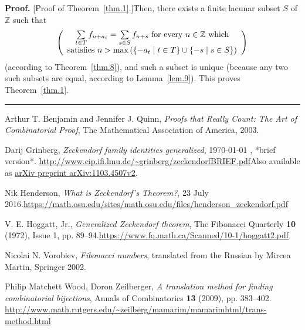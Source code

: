 \documentclass[numbers=enddot,12pt,final,onecolumn,notitlepage]{scrartcl}%
\numberwithin{exer}{section}
\theoremstyle{definition}
\newenvironment{proof}[1][Proof]{\noindent\textbf{#1.} }{\ \rule{0.5em}{0.5em}}
\let\sumnonlimits\sum
\renewcommand{\sum}{\sumnonlimits\limits}
\begin{document}
\begin{proof}
[Proof of Theorem~\ref{thm.1}.]Then, there exists a finite lacunar subset $S$
of $\mathbb{Z}$ such that
\[
\left(
\begin{array}
[c]{c}%
\sum\limits_{t\in T}f_{n+a_{t}}=\sum\limits_{s\in S}f_{n+s}\text{ for every
}n\in\mathbb{Z}\text{ which}\\
\text{satisfies }n>\max\left(  \left\{  -a_{t}\mid t\in T\right\}
\cup\left\{  -s\mid s\in S\right\}  \right)
\end{array}
\right)
\]
(according to Theorem~\ref{thm.8}), and such a subset is unique (because any
two such subsets are equal, according to Lemma~\ref{lem.9}). This proves
Theorem~\ref{thm.1}.
\end{proof}

\begin{thebibliography}{99999999}                                                                                         %


Arthur T. Benjamin and Jennifer J. Quinn,
\textit{Proofs that Really Count: The Art of Combinatorial Proof}, The
Mathematical Association of America, 2003.

Darij Grinberg, \textit{Zeckendorf family
identities generalized},
\today
, *brief version*.\newline%
\url{http://www.cip.ifi.lmu.de/~grinberg/zeckendorfBRIEF.pdf}\newline Also
available as \href{https://arxiv.org/abs/1103.4507v2}{arXiv preprint
arXiv:1103.4507v2}.

Nik Henderson, \textit{What is Zeckendorf's
Theorem?}, 23 July 2016.\newline\url{https://math.osu.edu/sites/math.osu.edu/files/henderson_zeckendorf.pdf}

V. E. Hoggatt, Jr., \textit{Generalized Zeckendorf
theorem}, The Fibonacci Quarterly \textbf{10} (1972), Issue 1, pp.
89--94.\newline\url{https://www.fq.math.ca/Scanned/10-1/hoggatt2.pdf}

Nicolai N. Vorobiev, \textit{Fibonacci numbers},
translated from the Russian by Mircea Martin, Springer 2002.

Philip Matchett Wood, Doron Zeilberger, \textit{A
translation method for finding combinatorial bijections}, Annals of
Combinatorics \textbf{13} (2009), pp. 383--402. \newline\url{http://www.math.rutgers.edu/~zeilberg/mamarim/mamarimhtml/trans-method.html}
\end{thebibliography}
\end{document}
